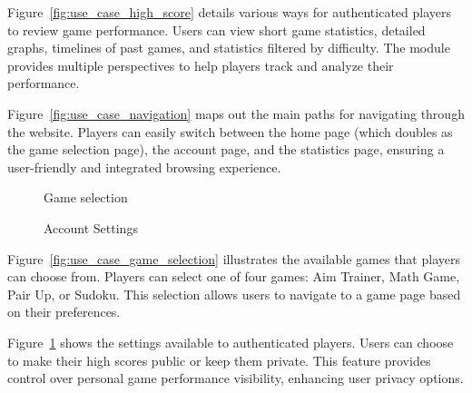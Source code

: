 \documentclass[11pt,a4paper]{article}
\newcommand{\inputdiagram}[1]{}
\newcommand{\textwidthdiagram}[2][1]{%
  \resizebox{#1\textwidth}{!}{\inputdiagram{#2}}%
}
\begin{document}
Figure~\ref{fig:use_case_high_score} details various ways for authenticated players to review game performance. Users
can view short game statistics, detailed graphs, timelines of past games, and
statistics filtered by difficulty. The module provides multiple perspectives to
help players track and analyze their performance.

Figure~\ref{fig:use_case_navigation} maps out the main paths for navigating through the website.
Players can easily switch between the home page (which doubles as the game
selection page), the account page, and the statistics page, ensuring a
user-friendly and integrated browsing experience.

\begin{figure}[H]
    \begin{minipage}[b]{0.48\textwidth}
        \centering
        \textwidthdiagram{use_case_game_selection.tex}
        \caption{Game selection}
        \label{fig:use_case_game_selection}
    \end{minipage}
    \hfil
    \begin{minipage}[b]{0.48\textwidth}
        \centering
        \textwidthdiagram{use_case_settings.tex}
        \caption{Account Settings}
        \label{fig:use_case_settings}
    \end{minipage}
\end{figure}
Figure~\ref{fig:use_case_game_selection} illustrates the available games that
players can choose from. Players can select one of four games: Aim Trainer,
Math Game, Pair Up, or Sudoku. This selection allows users to navigate to
a game page based on their preferences.

Figure~\ref{fig:use_case_settings} shows the settings available to
authenticated players. Users can choose to make their high scores public
or keep them private. This feature provides control over personal game
performance visibility, enhancing user privacy options.
\end{document}
